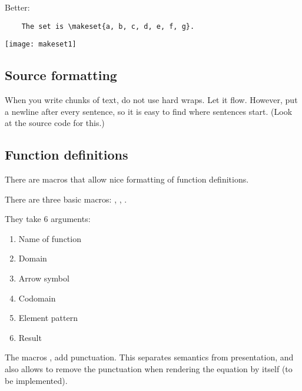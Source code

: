 Better:

\begin{verbatim}
    The set is \makeset{a, b, c, d, e, f, g}.
\end{verbatim}

\begin{widepar}
	\centering
	\texttt{[image: makeset1]}
\end{widepar}

\subsection{Source formatting}

When you write chunks of text, do not use hard wraps.
Let it flow.
However, put a newline after every sentence, so it is easy to find where sentences start.
(Look at the source code for this.)

\subsection{Function definitions}

There are macros that allow nice formatting of function definitions.

There are three basic macros:
, , .

They take 6 arguments:
\begin{enumerate}
	\item Name of function
	\item Domain
	\item Arrow symbol
	\item Codomain
	\item Element pattern
	\item Result
\end{enumerate}

The macros ,  add punctuation.
This separates semantics from presentation, and also allows to remove the punctuation when rendering the equation by itself (to be implemented).

